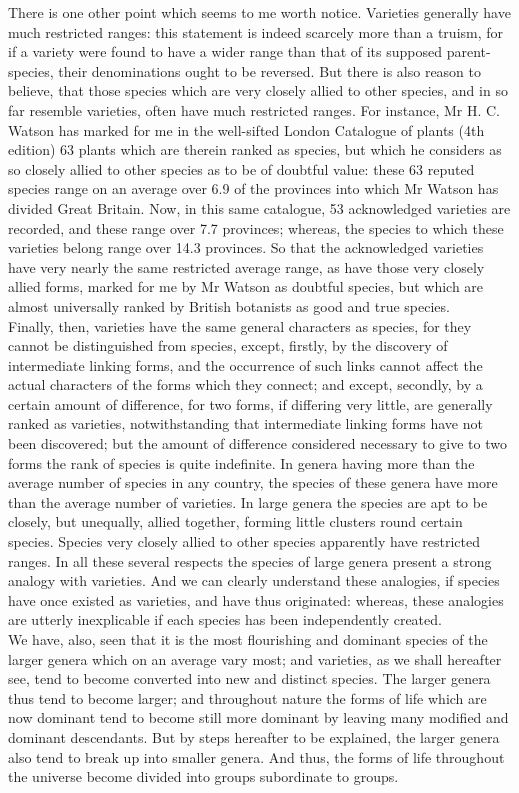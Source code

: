 \indent There is one other point which seems to me worth notice.  Varieties generally have much restricted ranges: this statement is indeed scarcely more than a truism, for if a variety were found to have a wider range than that of its supposed parent-species, their denominations ought to be reversed. But there is also reason to believe, that those species which are very closely allied to other species, and in so far resemble varieties, often have much restricted ranges. For instance, Mr H. C. Watson has marked for me in the well-sifted London Catalogue of plants (4th edition) 63 plants which are therein ranked as species, but which he considers as so closely allied to other species as to be of doubtful value: these 63 reputed species range on an average over 6.9 of the provinces into which Mr Watson has divided Great Britain. Now, in this same catalogue, 53 acknowledged varieties are recorded, and these range over 7.7 provinces; whereas, the species to which these varieties belong range over 14.3 provinces. So that the acknowledged varieties have very nearly the same restricted average range, as have those very closely allied forms, marked for me by Mr Watson as doubtful species, but which are almost universally ranked by British botanists as good and true species. \\
\indent Finally, then, varieties have the same general characters as species, for they cannot be distinguished from species, except, firstly, by the discovery of intermediate linking forms, and the occurrence of such links cannot affect the actual characters of the forms which they connect; and except, secondly, by a certain amount of difference, for two forms, if differing very little, are generally ranked as varieties, notwithstanding that intermediate linking forms have not been discovered; but the amount of difference considered necessary to give to two forms the rank of species is quite indefinite. In genera having more than the average number of species in any country, the species of these genera have more than the average number of varieties. In large genera the species are apt to be closely, but unequally, allied together, forming little clusters round certain species.  Species very closely allied to other species apparently have restricted ranges. In all these several respects the species of large genera present a strong analogy with varieties. And we can clearly understand these analogies, if species have once existed as varieties, and have thus originated: whereas, these analogies are utterly inexplicable if each species has been independently created. \\
\indent We have, also, seen that it is the most flourishing and dominant species of the larger genera which on an average vary most; and varieties, as we shall hereafter see, tend to become converted into new and distinct species. The larger genera thus tend to become larger; and throughout nature the forms of life which are now dominant tend to become still more dominant by leaving many modified and dominant descendants. But by steps hereafter to be explained, the larger genera also tend to break up into smaller genera. And thus, the forms of life throughout the universe become divided into groups subordinate to groups.